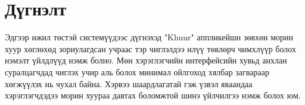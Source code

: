 \section{Дүгнэлт}
Эдгээр ижил төстэй системүүдээс дүгнэхэд "Khuur" аппликейшн зөвхөн морин хуур хөглөхөд зориулагдсан учраас тэр чиглэлдээ илүү төвлөрч чимхлүүр болох нэмэлт үйлдлүүд нэмж болно. Мөн хэрэглэгчийн интерфейсийн хувьд анхлан суралцагчдад чиглэх учир аль болох минимал ойлгоход хялбар загвараар хөгжүүлэх нь чухал байна. Хэрвээ шаардлагатай гэж үзвэл яваандаа хэрэглэгчдэдээ морин хуураа давтах боломжтой шинэ үйлчилгээ нэмж болох юм.

